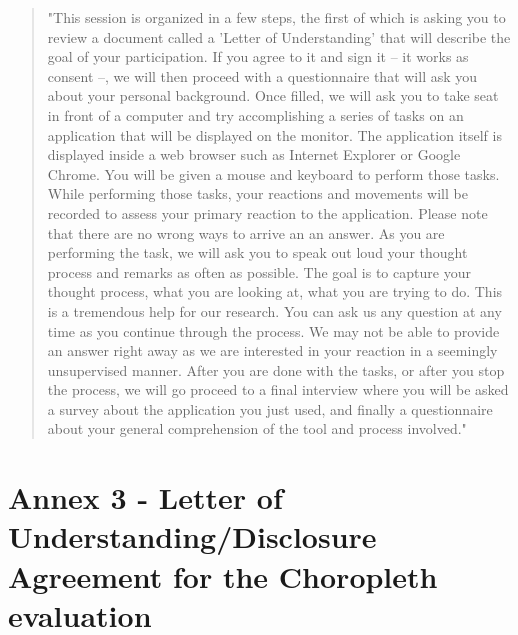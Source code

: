 \documentclass[twocolumn, letterpaper,13pt]{scrartcl}
\begin{document}
    \begin{quote}
        "This session is organized in a few steps, the first of which is asking you to review a document called a 'Letter of Understanding' that will describe the goal of your participation. If you agree to it and sign it -- it works as consent --, we will then proceed with a questionnaire that will ask you about your personal background. Once filled, we will ask you to take seat in front of a computer and try accomplishing a series of tasks on an application that will be displayed on the monitor. The application itself is displayed inside a web browser such as Internet Explorer or Google Chrome. You will be given a mouse and keyboard to perform those tasks. 
        \newline\newline
        While performing those tasks, your reactions and movements will be recorded to assess your primary reaction to the application. Please note that there are no wrong ways to arrive an an answer. As you are performing the task, we will ask you to speak out loud your thought process and remarks as often as possible. The goal is to capture your thought process, what you are looking at, what you are trying to do. This is a tremendous help for our research.
        \newline\newline
        You can ask us any question at any time as you continue through the process. We may not be able to provide an answer right away as we are interested in your reaction in a seemingly unsupervised manner.
        \newline\newline
        After you are done with the tasks, or after you stop the process, we will go proceed to a final interview where you will be asked a survey about the application you just used, and finally a questionnaire about your general comprehension of the tool and process involved."
    \end{quote}
    
    \section*{Annex 3 - Letter of Understanding/Disclosure Agreement for the Choropleth evaluation}
    
\end{document}
